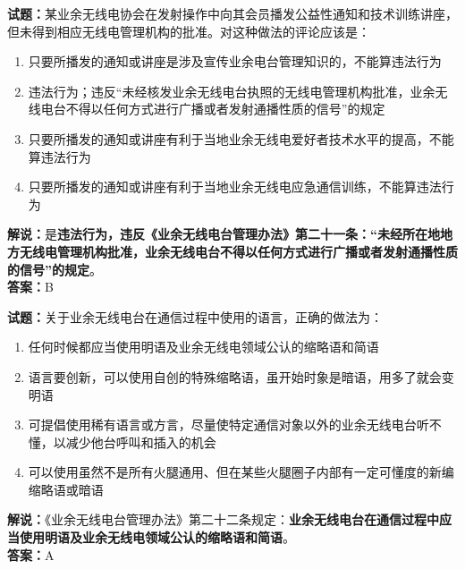 \documentclass{ctexbook}
\begin{document}
\vspace{1em}

\textbf{试题：}某业余无线电协会在发射操作中向其会员播发公益性通知和技术训练讲座，但未得到相应无线电管理机构的批准。对这种做法的评论应该是：
\begin{enumerate}[leftmargin=3em]
  \item 只要所播发的通知或讲座是涉及宣传业余电台管理知识的，不能算违法行为
  \item 违法行为；违反“未经核发业余无线电台执照的无线电管理机构批准，业余无线电台不得以任何方式进行广播或者发射通播性质的信号”的规定
  \item 只要所播发的通知或讲座有利于当地业余无线电爱好者技术水平的提高，不能算违法行为
  \item 只要所播发的通知或讲座有利于当地业余无线电应急通信训练，不能算违法行为
\end{enumerate}
\noindent\textbf{解说：}是\textbf{违法行为，违反《业余无线电台管理办法》第二十一条：“未经所在地地方无线电管理机构批准，业余无线电台不得以任何方式进行广播或者发射通播性质的信号”的规定}。\\\noindent\textbf{答案：}B

\vspace{1em}

\textbf{试题：}关于业余无线电台在通信过程中使用的语言，正确的做法为：
\begin{enumerate}[leftmargin=3em]
  \item 任何时候都应当使用明语及业余无线电领域公认的缩略语和简语
  \item 语言要创新，可以使用自创的特殊缩略语，虽开始时象是暗语，用多了就会变明语
  \item 可提倡使用稀有语言或方言，尽量使特定通信对象以外的业余无线电台听不懂，以减少他台呼叫和插入的机会
  \item 可以使用虽然不是所有火腿通用、但在某些火腿圈子内部有一定可懂度的新编缩略语或暗语
\end{enumerate}
\noindent\textbf{解说：}《业余无线电台管理办法》第二十二条规定：\textbf{业余无线电台在通信过程中应当使用明语及业余无线电领域公认的缩略语和简语}。\\\noindent\textbf{答案：}A

\vspace{1em}
\end{document}
